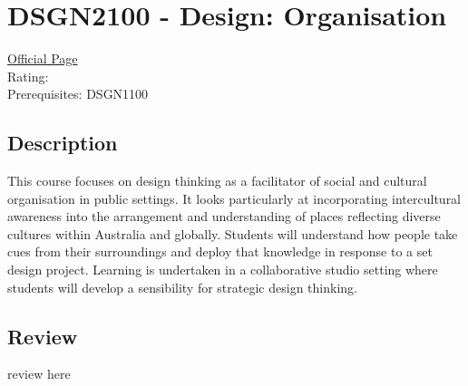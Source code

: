 \hypertarget{DSGN2100}{\section{DSGN2100 - Design: Organisation}}

\large
\textcolor{turbo_purple}{\href{https://my.uq.edu.au/programs-courses/course.html?course_code=DSGN2100}{Official Page}} \\
Rating: \cstar\cstar\cstar\cstar\ostar \\
Prerequisites: DSGN1100

\normalsize
\subsection*{Description}
This course focuses on design thinking as a facilitator of social and cultural organisation in public settings.
It looks particularly at incorporating intercultural awareness into the arrangement and understanding of places reflecting diverse cultures within Australia and globally.
Students will understand how people take cues from their surroundings and deploy that knowledge in response to a set design project.
Learning is undertaken in a collaborative studio setting where students will develop a sensibility for strategic design thinking.

\subsection*{Review}
review here
